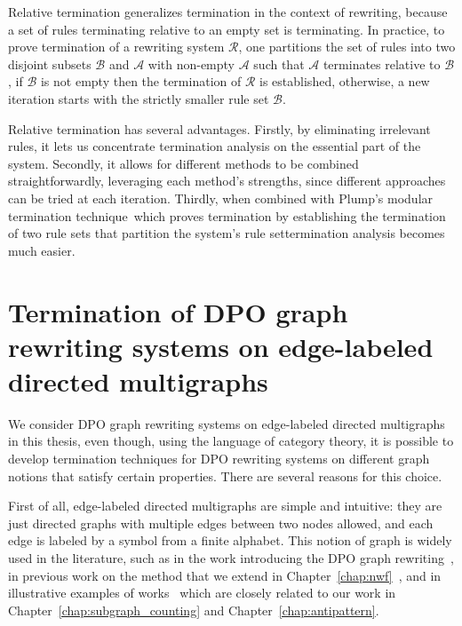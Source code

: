 Relative termination generalizes termination in the context of rewriting, because a set of rules terminating relative to an empty set is terminating. In practice, to prove termination of a rewriting system $\mathcal{R}$, one partitions the set of rules into two disjoint subsets \( \mathcal{B} \) and \( \mathcal{A} \) with non-empty $\mathcal{A}$ such that \( \mathcal{A} \) terminates relative to \( \mathcal{B} \), if $\mathcal{B}$ is not empty then the termination of $\mathcal{R}$ is established, otherwise, a new iteration starts with the strictly smaller rule set $\mathcal{B}$.
 
Relative termination has several advantages.
  Firstly, by eliminating irrelevant rules, it lets us concentrate
  termination analysis on the essential part of the system.
  Secondly, it allows for different methods to be combined straightforwardly, leveraging each method's strengths, since different approaches can be tried at each iteration.
   Thirdly, when combined with Plump's modular termination technique~\cite{plump2018modular}\textemdash which proves termination by establishing the termination of two rule sets that partition the system's rule set\textemdash termination analysis becomes much easier.


\section{Termination of DPO graph rewriting systems on edge-labeled directed multigraphs} 
We consider DPO graph rewriting systems on edge-labeled directed multigraphs in this thesis, even though, using the language of category theory, it is possible to develop termination techniques for DPO rewriting systems on different graph notions that satisfy certain properties. There are several reasons for this choice. 

First of all, edge-labeled directed multigraphs are simple and intuitive: they are just directed graphs with multiple edges between two nodes allowed, and each edge is labeled by a symbol from a finite alphabet. This notion of graph is widely used in the literature, such as in the work introducing the DPO graph rewriting~\cite{ehrig1973graph}, in previous work on the method that we extend in Chapter~\ref{chap:nwf}~\cite{bruggink2014termination,bruggink2015proving,zantema2014termination}, and in illustrative examples of works~\cite{overbeek2024termination_lmcs,endrullis2024generalized_icgt} which are closely related to our work in Chapter~\ref{chap:subgraph_counting} and Chapter~\ref{chap:antipattern}.

